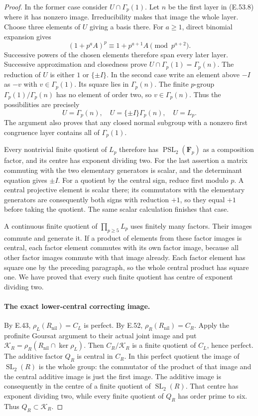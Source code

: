 \begin{proof}
In the former case consider $U\cap\Gamma_p(1)$.
Let $n$ be the first layer in \textup{(E.53.8)}
where it has nonzero image. Irreducibility makes
that image the whole layer. Choose three elements
of $U$ giving a basis there.
For $a\geq1$, direct binomial expansion gives
\[
           (1+p^a A)^p\equiv1+p^{a+1}A\pmod{p^{a+2}}.
 \tag{E.53.9}
\]
Successive powers of the chosen elements therefore
span every later layer. Successive approximation
and closedness prove
$U\cap\Gamma_p(1)=\Gamma_p(n)$.
The reduction of $U$ is either $1$ or $\{\pm I\}$.
In the second case write an element above $-I$ as
$-v$ with $v\in\Gamma_p(1)$.
Its square lies in $\Gamma_p(n)$.
The finite $p$-group $\Gamma_p(1)/\Gamma_p(n)$
has no element of order two, so $v\in\Gamma_p(n)$.
Thus the possibilities are precisely
\[
                  U=\Gamma_p(n),\quad
                  U=\{\pm I\}\Gamma_p(n),\quad U=L_p.
 \tag{E.53.10}
\]
The argument also proves that any closed normal
subgroup with a nonzero first congruence layer
contains all of $\Gamma_p(1)$.

Every nontrivial finite quotient of $L_p$ therefore
has $\operatorname{PSL}_2(\mathbf F_p)$ as a
composition factor, and its centre has exponent
dividing two. For the last assertion a matrix
commuting with the two elementary generators is
scalar, and the determinant equation gives $\pm I$.
For a quotient by the central sign, reduce first
modulo $p$. A central projective element is scalar
there; its commutators with the elementary generators
are consequently both signs with reduction $+1$,
so they equal $+1$ before taking the quotient.
The same scalar calculation finishes that case.

A continuous finite quotient of $\prod_{p\geq5}L_p$
uses finitely many factors. Their images commute
and generate it. If a product of elements from
these factor images is central, each factor element
commutes with its own factor image, because all
other factor images commute with that image already.
Each factor element has square one by the preceding
paragraph, so the whole central product has square
one. We have proved that every such finite quotient
has centre of exponent dividing two.

\paragraph{The exact lower-central correcting image.}
By E.43, $\rho_L(R_{\mathrm{nil}})=C_L$ is perfect.
By E.52, $\rho_R(R_{\mathrm{nil}})=C_R$.
Apply the profinite Goursat argument to their actual
joint image and put
$\mathcal K_R=\rho_R(R_{\mathrm{nil}}\cap\ker\rho_L)$.
Then $C_R/\mathcal K_R$ is a finite quotient of
$C_L$, hence perfect.
The additive factor $Q_R$ is central in $C_R$.
In this perfect quotient the image of
$\operatorname{SL}_2(R)$ is the whole group: the
commutator of the product of that image and the
central additive image is just the first image.
The additive image is consequently in the centre
of a finite quotient of $\operatorname{SL}_2(R)$.
That centre has exponent dividing two, while every
finite quotient of $Q_R$ has order prime to six.
Thus $Q_R\subset\mathcal K_R$.


\end{proof}
